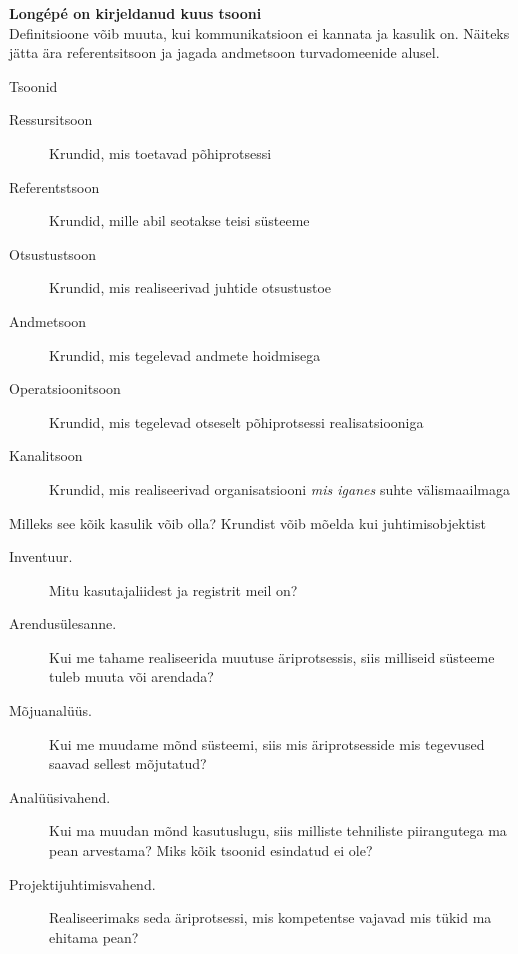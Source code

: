 \documentclass{beamer}
\begin{document}
\begin{frame}[fragile]
	\begin{center}
		\LARGE{\textbf{Longépé on kirjeldanud kuus tsooni}}
		\\[4cm]
		\small{Definitsioone võib muuta, kui kommunikatsioon ei kannata ja kasulik on. Näiteks jätta ära referentsitsoon ja jagada andmetsoon turvadomeenide alusel.}
	\end{center}
\end{frame}

\begin{frame}{Tsoonid}
	\begin{description}
		\item[Ressursitsoon] Krundid, mis toetavad põhiprotsessi
		\item[Referentstsoon] Krundid, mille abil seotakse teisi süsteeme
		\item[Otsustustsoon] Krundid, mis realiseerivad juhtide otsustustoe
		\item[Andmetsoon] Krundid, mis tegelevad andmete hoidmisega
		\item[Operatsioonitsoon] Krundid, mis tegelevad otseselt põhiprotsessi realisatsiooniga
		\item[Kanalitsoon] Krundid, mis realiseerivad organisatsiooni \emph{mis iganes} suhte välismaailmaga
	\end{description}
\end{frame}

\begin{frame}{Milleks see kõik kasulik võib olla?}
	Krundist võib mõelda kui juhtimisobjektist
	
	\begin{description}
		\item[Inventuur.] Mitu kasutajaliidest ja registrit meil on?
		\item[Arendusülesanne.] Kui me tahame realiseerida muutuse äriprotsessis, siis milliseid süsteeme tuleb muuta või arendada?
		\item[Mõjuanalüüs.] Kui me muudame mõnd süsteemi, siis mis äriprotsesside mis tegevused saavad sellest mõjutatud?
		\item[Analüüsivahend.] Kui ma muudan mõnd kasutuslugu, siis milliste tehniliste piirangutega ma pean arvestama? Miks kõik tsoonid esindatud ei ole?
		\item[Projektijuhtimisvahend.] Realiseerimaks seda äriprotsessi, mis kompetentse vajavad mis tükid ma ehitama pean?
	\end{description}
\end{frame}
\end{document}

